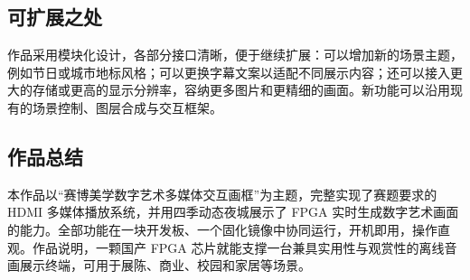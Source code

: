 \subsection{可扩展之处}
作品采用模块化设计，各部分接口清晰，便于继续扩展：可以增加新的场景主题，例如节日或城市地标风格；可以更换字幕文案以适配不同展示内容；还可以接入更大的存储或更高的显示分辨率，容纳更多图片和更精细的画面。新功能可以沿用现有的场景控制、图层合成与交互框架。

\subsection{作品总结}
本作品以“赛博美学数字艺术多媒体交互画框”为主题，完整实现了赛题要求的 HDMI 多媒体播放系统，并用四季动态夜城展示了 FPGA 实时生成数字艺术画面的能力。全部功能在一块开发板、一个固化镜像中协同运行，开机即用，操作直观。作品说明，一颗国产 FPGA 芯片就能支撑一台兼具实用性与观赏性的离线音画展示终端，可用于展陈、商业、校园和家居等场景。
